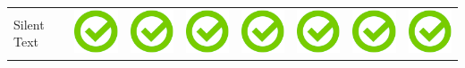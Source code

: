 \documentclass[10pt,foldmark,tumble]{leaflet}
\begin{document}
\begin{center}
{{\begin{tabular}{ L{2cm} | C{2cm} | C{2cm} | C{2cm} | C{2cm} | C{2cm} | C{2cm} | C{2cm} }
Silent Text & \includegraphics[scale=0.1]{pics/haken.png} & \includegraphics[scale=0.1]{pics/haken.png} & \includegraphics[scale=0.1]{pics/haken.png} & \includegraphics[scale=0.1]{pics/haken.png} & \includegraphics[scale=0.1]{pics/haken.png} & \includegraphics[scale=0.1]{pics/haken.png} & \includegraphics[scale=0.1]{pics/haken.png} \tabularnewline

\end{tabular}}}
\end{center}
\end{document}
